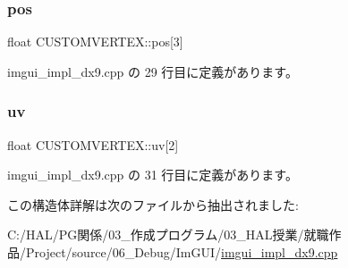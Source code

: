 \subsubsection{\texorpdfstring{pos}{pos}}
{\footnotesize\ttfamily float C\+U\+S\+T\+O\+M\+V\+E\+R\+T\+E\+X\+::pos\mbox{[}3\mbox{]}}



 imgui\+\_\+impl\+\_\+dx9.\+cpp の 29 行目に定義があります。

\mbox{\label{struct_c_u_s_t_o_m_v_e_r_t_e_x_a2c27e901db37bc828fb408010596304c}} 
\subsubsection{\texorpdfstring{uv}{uv}}
{\footnotesize\ttfamily float C\+U\+S\+T\+O\+M\+V\+E\+R\+T\+E\+X\+::uv\mbox{[}2\mbox{]}}



 imgui\+\_\+impl\+\_\+dx9.\+cpp の 31 行目に定義があります。



この構造体詳解は次のファイルから抽出されました\+:\begin{DoxyCompactItemize}
\item 
C\+:/\+H\+A\+L/\+P\+G関係/03\+\_\+作成プログラム/03\+\_\+\+H\+A\+L授業/就職作品/\+Project/source/06\+\_\+\+Debug/\+Im\+G\+U\+I/\mbox{\hyperlink{imgui__impl__dx9_8cpp}{imgui\+\_\+impl\+\_\+dx9.\+cpp}}\end{DoxyCompactItemize}

